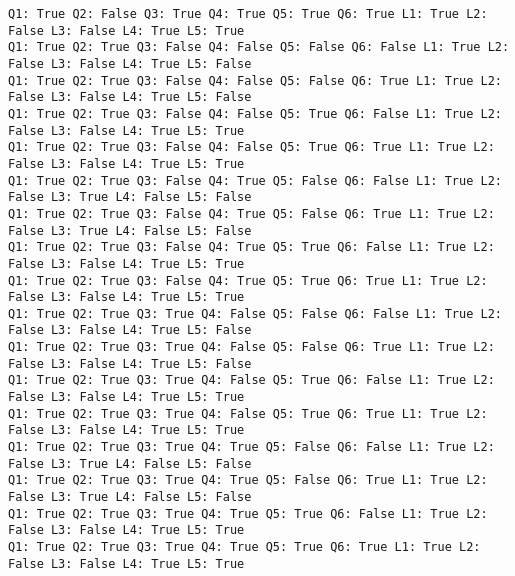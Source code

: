 \documentclass[a4paper,10pt,ngerman]{scrartcl}
\begin{document}
\begin{lstlisting}[frame=tb,breaklines=true]
Q1: True Q2: False Q3: True Q4: True Q5: True Q6: True L1: True L2: False L3: False L4: True L5: True
Q1: True Q2: True Q3: False Q4: False Q5: False Q6: False L1: True L2: False L3: False L4: True L5: False
Q1: True Q2: True Q3: False Q4: False Q5: False Q6: True L1: True L2: False L3: False L4: True L5: False
Q1: True Q2: True Q3: False Q4: False Q5: True Q6: False L1: True L2: False L3: False L4: True L5: True
Q1: True Q2: True Q3: False Q4: False Q5: True Q6: True L1: True L2: False L3: False L4: True L5: True
Q1: True Q2: True Q3: False Q4: True Q5: False Q6: False L1: True L2: False L3: True L4: False L5: False
Q1: True Q2: True Q3: False Q4: True Q5: False Q6: True L1: True L2: False L3: True L4: False L5: False
Q1: True Q2: True Q3: False Q4: True Q5: True Q6: False L1: True L2: False L3: False L4: True L5: True
Q1: True Q2: True Q3: False Q4: True Q5: True Q6: True L1: True L2: False L3: False L4: True L5: True
Q1: True Q2: True Q3: True Q4: False Q5: False Q6: False L1: True L2: False L3: False L4: True L5: False
Q1: True Q2: True Q3: True Q4: False Q5: False Q6: True L1: True L2: False L3: False L4: True L5: False
Q1: True Q2: True Q3: True Q4: False Q5: True Q6: False L1: True L2: False L3: False L4: True L5: True
Q1: True Q2: True Q3: True Q4: False Q5: True Q6: True L1: True L2: False L3: False L4: True L5: True
Q1: True Q2: True Q3: True Q4: True Q5: False Q6: False L1: True L2: False L3: True L4: False L5: False
Q1: True Q2: True Q3: True Q4: True Q5: False Q6: True L1: True L2: False L3: True L4: False L5: False
Q1: True Q2: True Q3: True Q4: True Q5: True Q6: False L1: True L2: False L3: False L4: True L5: True
Q1: True Q2: True Q3: True Q4: True Q5: True Q6: True L1: True L2: False L3: False L4: True L5: True
\end{lstlisting}
\end{document}
